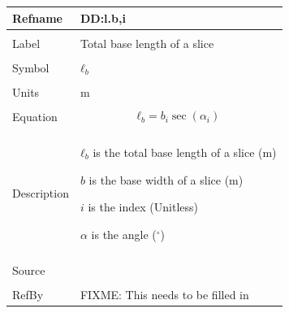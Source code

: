 \documentclass[12pt]{article}
\begin{document}
\noindent \begin{minipage}{\textwidth}
\begin{tabular}{p{} p{}}
\toprule \textbf{Refname} & \textbf{DD:l.b,i}
\label{DD:l.b,i}
\\ \midrule \\
Label & Total base length of a slice
\\ \midrule \\
Symbol & ${ℓ_{b}}$
\\ \midrule \\
Units & m
\\ \midrule \\
Equation & \begin{dmath}
           {ℓ_{b}}=b_{i} \sec\left(α_{i}\right)
           \end{dmath}
\\ \midrule \\
Description & \begin{symbDescription}
              \item{${ℓ_{b}}$ is the total base length of a slice (m)}
              \item{$b$ is the base width of a slice (m)}
              \item{$i$ is the index (Unitless)}
              \item{$α$ is the angle (${}^{\circ}$)}
              \end{symbDescription}
\\ \midrule \\
Source & 
\\ \midrule \\
RefBy & FIXME: This needs to be filled in
\\ \bottomrule \end{tabular}
\end{minipage}\\
~\newline
\end{document}
